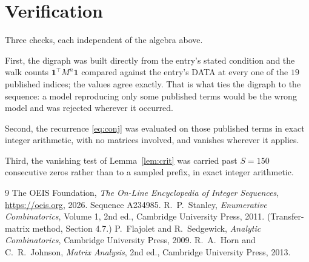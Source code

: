 \documentclass[11pt,a4paper]{article}
\theoremstyle{plain}
\theoremstyle{definition}
\begin{document}
\section{Verification}

Three checks, each independent of the algebra above.

First, the digraph was built directly from the entry's stated condition and the walk counts
$\mathbf{1}^{\!\top}M^{n}\mathbf{1}$ compared against the entry's DATA at every one of
the $19$ published indices; the values agree exactly. That is what ties the digraph to
the sequence: a model reproducing only some published terms would be the wrong model and
was rejected wherever it occurred.

Second, the recurrence \eqref{eq:conj} was evaluated on those published terms in exact
integer arithmetic, with no matrices involved, and vanishes wherever it applies.

Third, the vanishing test of Lemma~\ref{lem:crit} was carried past $S=150$ consecutive
zeros rather than to a sampled prefix, in exact integer arithmetic.

\begin{thebibliography}{9}
 The OEIS Foundation, \emph{The On-Line Encyclopedia of Integer
Sequences}, \url{https://oeis.org}, 2026. Sequence A234985.
 R.~P.~Stanley, \emph{Enumerative Combinatorics}, Volume 1, 2nd ed.,
Cambridge University Press, 2011. (Transfer-matrix method, Section 4.7.)
 P.~Flajolet and R.~Sedgewick, \emph{Analytic Combinatorics}, Cambridge
University Press, 2009.
 R.~A.~Horn and C.~R.~Johnson, \emph{Matrix Analysis}, 2nd ed., Cambridge
University Press, 2013.
\end{thebibliography}
\end{document}
